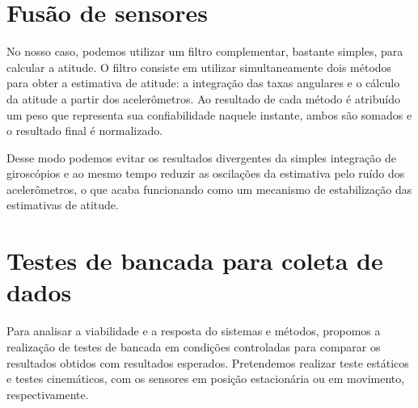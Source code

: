 \section{Fusão de sensores}

No nosso caso, podemos utilizar um filtro complementar, bastante simples, para calcular a atitude. O filtro consiste em utilizar simultaneamente dois métodos para obter a estimativa de atitude: a integração das taxas angulares e o cálculo da atitude a partir dos acelerômetros. Ao resultado de cada método é atribuído um peso que representa sua confiabilidade naquele instante, ambos são somados e o resultado final é normalizado.

Desse modo podemos evitar os resultados divergentes da simples integração de giroscópios e ao mesmo tempo reduzir as oscilações da estimativa pelo ruído dos acelerômetros, o que acaba funcionando como um mecanismo de estabilização das estimativas de atitude.

\section{Testes de bancada para coleta de dados}

Para analisar a viabilidade e a resposta do sistemas e métodos, propomos a realização de testes de bancada em condições controladas para comparar os resultados obtidos com resultados esperados. Pretendemos realizar teste estáticos e testes cinemáticos, com os sensores em posição estacionária ou em movimento, respectivamente.


